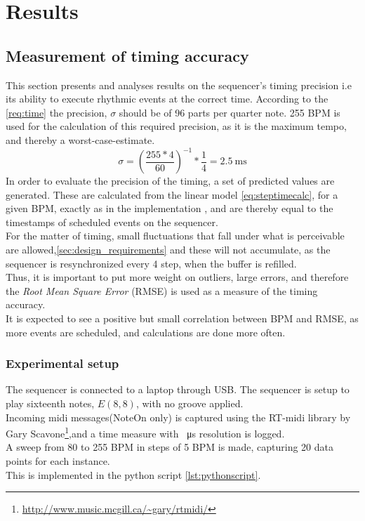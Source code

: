 \chapter{Results}

\section{Measurement of timing accuracy}
This section presents and analyses results on the sequencer's timing precision i.e its ability to execute rhythmic events at the correct time. According to the \cref{req:time} the  precision, $\sigma$ should be of 96 parts per quarter note. 255 BPM is used for the calculation of this required precision, as it is the maximum tempo, and thereby a worst-case-estimate.\\
$$\sigma = (\frac{255*4}{60})^{-1} *\frac{1}{4} =  \SI{2.5}{\milli\second}$$
In order to evaluate the precision of the timing, a set of predicted values are generated. These are calculated from the linear model \cref{eq:steptimecalc}, for a given BPM, exactly as in the implementation , and are thereby equal to the timestamps of scheduled events on the sequencer. \\

For the matter of timing, small fluctuations that fall under what is perceivable are allowed,\cref{sec:design_requirements} and these will not accumulate, as the sequencer is resynchronized every 4 step, when the buffer is refilled.\\
Thus, it is important to put more weight on outliers, large errors, and therefore the \textit{Root Mean Square Error} (RMSE) is used as a measure of the timing accuracy. \\
It is expected to see a positive but small correlation between BPM and RMSE, as more events are scheduled, and calculations are done more often. 

\subsection{Experimental setup}
\label{sec:exp_setup}
The sequencer is connected to a laptop through USB. The sequencer is setup to play sixteenth notes, $E(8,8)$, with no groove applied.\\
Incoming midi messages(NoteOn only) is captured using the RT-midi library by Gary Scavone\footnote{\url{http://www.music.mcgill.ca/~gary/rtmidi/}},and a time measure with \SI{}{\micro\second} resolution is logged.\\
A sweep from 80 to 255 BPM in steps of 5 BPM is made, capturing 20 data points for each instance. \\
This is implemented in the python script \cref{lst:pythonscript}.

